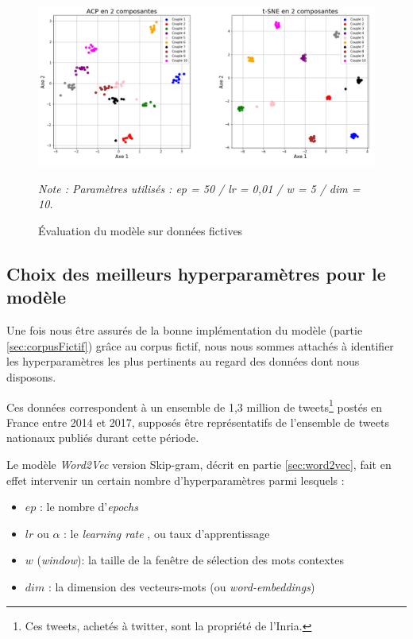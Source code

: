 \documentclass[11pt,french,french]{article}
\let\rmarkdownfootnote\footnote%
\def\footnote{\protect\rmarkdownfootnote}
\begin{document}
\begin{figure}
\begin{center}
\includegraphics[width=1\textwidth]{img/figures.png}
\captionsetup{margin=0cm,format=hang,justification=justified}
\caption{Évaluation du modèle sur données fictives}\label{fig:figure_evaluation}
\end{center}
\vspace{-0.3cm}
\footnotesize
\emph{Note : Paramètres utilisés : ep = 50 / lr = 0,01 / w = 5 / dim = 10.}
\end{figure}

\subsection{Choix des meilleurs hyperparamètres pour le
modèle}\label{choix-des-meilleurs-hyperparamuxe8tres-pour-le-moduxe8le}

Une fois nous être assurés de la bonne implémentation du modèle (partie
\ref{sec:corpusFictif}) grâce au corpus fictif, nous nous sommes
attachés à identifier les hyperparamètres les plus pertinents au regard
des données dont nous disposons.

Ces données correspondent à un ensemble de 1,3 million de
tweets\footnote{Ces tweets, achetés à twitter, sont la propriété de
  l'Inria.} postés en France entre 2014 et 2017, supposés être
représentatifs de l'ensemble de tweets nationaux publiés durant cette
période.

Le modèle \emph{Word2Vec} version Skip-gram, décrit en partie
\ref{sec:word2vec}, fait en effet intervenir un certain nombre
d'hyperparamètres parmi lesquels :

\begin{itemize}
\item $ep$ : le nombre d'\og \emph{epochs} \fg{}
\item $lr$ ou $\alpha$ : le \og \emph{learning rate} \fg{}, ou taux d'apprentissage
\item $w$ (\emph{window}): la taille de la fenêtre de sélection des mots contextes
\item $dim$ : la dimension des vecteurs-mots (ou \emph{word-embeddings})
\end{itemize}
\end{document}
